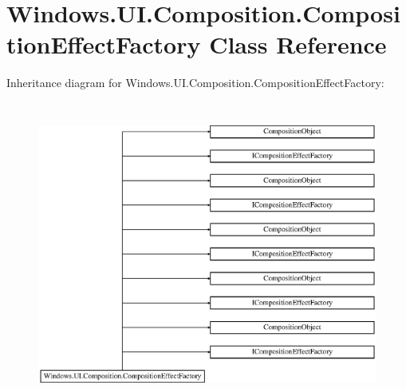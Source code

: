 \hypertarget{class_windows_1_1_u_i_1_1_composition_1_1_composition_effect_factory}{}\section{Windows.\+U\+I.\+Composition.\+Composition\+Effect\+Factory Class Reference}
\label{class_windows_1_1_u_i_1_1_composition_1_1_composition_effect_factory}
Inheritance diagram for Windows.\+U\+I.\+Composition.\+Composition\+Effect\+Factory\+:\begin{figure}[H]
\begin{center}
\leavevmode
\includegraphics[height=10.065359cm]{class_windows_1_1_u_i_1_1_composition_1_1_composition_effect_factory}
\end{center}
\end{figure}
